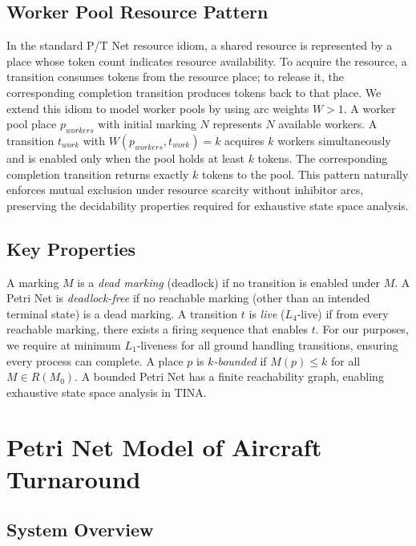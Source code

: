 \documentclass[conference]{IEEEtran}
\begin{document}
\subsection{Worker Pool Resource Pattern}

In the standard P/T Net resource idiom, a shared resource is represented by a
place whose token count indicates resource availability. To acquire the resource,
a transition consumes tokens from the resource place; to release it, the
corresponding completion transition produces tokens back to that place. We extend
this idiom to model worker pools by using arc weights $W > 1$. A worker pool
place $p_{\mathit{workers}}$ with initial marking $N$ represents $N$ available
workers. A transition $t_{\mathit{work}}$ with $W(p_{\mathit{workers}},
t_{\mathit{work}}) = k$ acquires $k$ workers simultaneously and is enabled only
when the pool holds at least $k$ tokens. The corresponding completion transition
returns exactly $k$ tokens to the pool. This pattern naturally enforces mutual
exclusion under resource scarcity without inhibitor arcs, preserving the
decidability properties required for exhaustive state space analysis.

\subsection{Key Properties}

A marking $M$ is a \textit{dead marking} (deadlock) if no transition is enabled
under $M$. A Petri Net is \textit{deadlock-free} if no reachable marking (other
than an intended terminal state) is a dead marking. A transition $t$ is
\textit{live} ($L_4$-live) if from every reachable marking, there exists a
firing sequence that enables $t$. For our purposes, we require at minimum
$L_1$-liveness for all ground handling transitions, ensuring every process can
complete. A place $p$ is \textit{$k$-bounded} if $M(p) \leq k$ for all
$M \in R(M_0)$. A bounded Petri Net has a finite reachability graph, enabling
exhaustive state space analysis in TINA.


\section{Petri Net Model of Aircraft Turnaround}

\subsection{System Overview}
\end{document}
